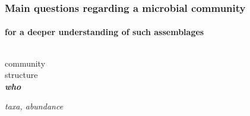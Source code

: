 \documentclass{beamer}
\begin{document}
\begin{frame}
\begin{singlespace}
\begin{tikzpicture}[overlay,remember picture]

                  

         \end{tikzpicture}
      \end{singlespace}

   \end{frame}

   \begin{frame}
      \frametitle{Main questions regarding a microbial community}
      \framesubtitle{for a deeper understanding of such assemblages}
      \begin{singlespace}


         \begin{columns}[onlytextwidth]
            

               \begin{center}

                  community \\ structure   \\ \textbf{\textit{who}}  

                  \hrulefill

                  \scriptsize \textit{taxa, abundance}

               \end{center}



               \begin{center}


\end{center}
\end{columns}
\end{singlespace}
\end{frame}
\end{document}
